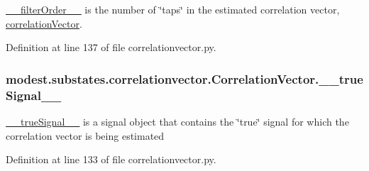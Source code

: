 \hyperlink{classmodest_1_1substates_1_1correlationvector_1_1CorrelationVector_a6454cf8c143629a28cf684f6abbf4830}{\+\_\+\+\_\+filter\+Order\+\_\+\+\_\+} is the number of \char`\"{}taps\char`\"{} in the estimated correlation vector, \hyperlink{classmodest_1_1substates_1_1correlationvector_1_1CorrelationVector_a81da583ee9077067b6aaa354fd8a8c49}{correlation\+Vector}. 



Definition at line 137 of file correlationvector.\+py.

\subsubsection[{\texorpdfstring{\+\_\+\+\_\+true\+Signal\+\_\+\+\_\+}{__trueSignal__}}]{\setlength{\rightskip}{0pt plus 5cm}modest.\+substates.\+correlationvector.\+Correlation\+Vector.\+\_\+\+\_\+true\+Signal\+\_\+\+\_\+\hspace{0.3cm}{\ttfamily [private]}}\hypertarget{classmodest_1_1substates_1_1correlationvector_1_1CorrelationVector_af2f52cea1c695f36dd100f529c322e94}{}\label{classmodest_1_1substates_1_1correlationvector_1_1CorrelationVector_af2f52cea1c695f36dd100f529c322e94}


\hyperlink{classmodest_1_1substates_1_1correlationvector_1_1CorrelationVector_af2f52cea1c695f36dd100f529c322e94}{\+\_\+\+\_\+true\+Signal\+\_\+\+\_\+} is a signal object that contains the \char`\"{}true\char`\"{} signal for which the correlation vector is being estimated 



Definition at line 133 of file correlationvector.\+py.

